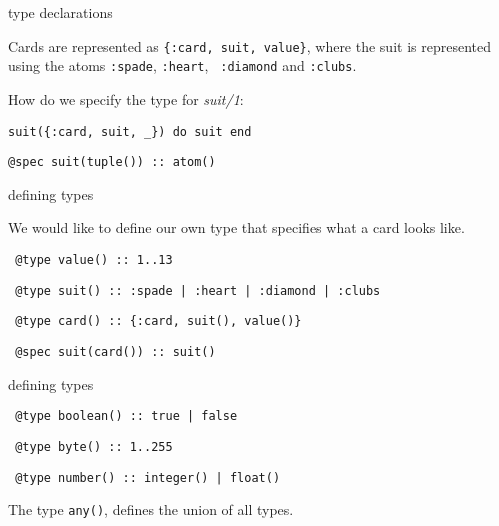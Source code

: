 \begin{frame}[fragile]{type declarations}

  \pause\vspace{10pt}

  Cards are represented as {\tt \{:card, suit, value\}}, where the
  suit is represented using the atoms {\tt :spade}, {\tt :heart}, {\tt
    :diamond} and {\tt :clubs}.

\vspace{10pt}
How do we specify the type for {\em suit/1}:

\begin{verbatim}
suit({:card, suit, _}) do suit end
\end{verbatim}
\pause\vspace{10pt}
\begin{verbatim}
@spec suit(tuple()) :: atom()
\end{verbatim}

\end{frame}

\begin{frame}[fragile]{defining types}

We would like to define our own type that specifies what a card looks like.

\begin{verbatim}
 @type value() :: 1..13 
\end{verbatim}
\pause

\begin{verbatim}
 @type suit() :: :spade | :heart | :diamond | :clubs 
\end{verbatim}

\pause
\begin{verbatim}
 @type card() :: {:card, suit(), value()}
\end{verbatim}

\pause
\begin{verbatim}
 @spec suit(card()) :: suit() 
\end{verbatim}

\end{frame}

\begin{frame}[fragile]{defining types}

\pause
\begin{verbatim}
 @type boolean() :: true | false
\end{verbatim}

\pause
\begin{verbatim}
 @type byte() :: 1..255 
\end{verbatim}

\pause
\begin{verbatim}
 @type number() :: integer() | float() 
\end{verbatim}
\pause
The type {\tt any()}, defines the union of all types.

\end{frame}


